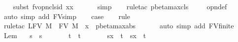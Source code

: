 \begin{isabellebody}
\ \ \isamarkupfalse%
\ {\isacharparenleft}subst{\isacharparenleft}{}{\isacharparenright}\ fv{\isacharunderscore}opn{\isacharunderscore}cls{\isacharunderscore}id{}{\isacharbrackleft}\ x{\isacharequal}x{\isacharbrackright}{\isacharparenright}\isanewline
\ \ \isamarkupfalse%
\ {}\ \isamarkupfalse%
\ simp\isanewline
\ \ \isamarkupfalse%
\ {\isacharparenleft}rule{\isacharunderscore}tac\ pbeta{\isacharunderscore}max{\isacharunderscore}cls{\isacharparenright}\isanewline
\ \ \isamarkupfalse%
\ {}\ opn{\isacharprime}{\isacharunderscore}def\ \isamarkupfalse%
\ {\isacharparenleft}auto\ simp\ add{\isacharcolon}\ FV{\isacharunderscore}simp{\isacharparenright}\isanewline
\isanewline
\ \ \isamarkupfalse%
\ {\isacharquery}case\isanewline
\ \ \isamarkupfalse%
\ rule\isanewline
\ \ \isamarkupfalse%
\ {\isacharparenleft}rule{\isacharunderscore}tac\ L{\isacharequal}{\isachardoublequoteopen}FV\ M{\isacharprime}\ {\isasymunion}\ FV\ M\ {\isasymunion}\ {\isacharbraceleft}x{\isacharbraceright}{\isachardoublequoteclose}\ \ pbeta{\isacharunderscore}max{\isachardot}abs{\isacharparenright}\isanewline
\ \ \isamarkupfalse%
\ {}\ \isamarkupfalse%
\ {\isacharparenleft}auto\ simp\ add{\isacharcolon}\ FV{\isacharunderscore}finite{\isacharparenright}\isanewline
{}\isamarkupfalse%
%
\endisatagproof
{\isafoldproof}%
%
\isadelimproof
%
\endisadelimproof
%
\isamarkuptrue%
\isamarkupfalse%
\ Lem{}{\isacharunderscore}{}{\isacharunderscore}{}{\isacharcolon}\isanewline
\ \ \ {\isachardoublequoteopen}s\ {\isasymggreater}\ s{\isacharprime}{\isachardoublequoteclose}\isanewline
\ \ \ \ \ \ \ {\isachardoublequoteopen}t\ {\isasymggreater}\ t{\isacharprime}{\isachardoublequoteclose}\isanewline
\ \ \ \ \ \ \ {\isachardoublequoteopen}{\isacharparenleft}s{\isacharbrackleft}x\ {\isacharcolon}{\isacharcolon}{\isacharequal}\ t{\isacharbrackright}{\isacharparenright}\ {\isasymggreater}\ {\isacharparenleft}s{\isacharprime}{\isacharbrackleft}x\ {\isacharcolon}{\isacharcolon}{\isacharequal}\ t{\isacharprime}{\isacharbrackright}{\isacharparenright}{\isachardoublequoteclose}\isanewline
%
\isadelimproof
%
\endisadelimproof
%
\isatagproof
{}\isamarkupfalse%

\end{isabellebody}
